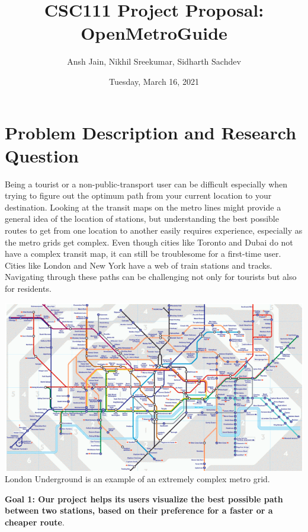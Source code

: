\documentclass[fontsize=11pt]{article}
\title{CSC111 Project Proposal: OpenMetroGuide}
\author{Ansh Jain, Nikhil Sreekumar, Sidharth Sachdev}
\date{Tuesday, March 16, 2021}
\begin{document}
    \maketitle

    \section*{Problem Description and Research Question}

    Being a tourist or a non-public-transport user can be difficult especially when trying to figure out the optimum path from your current location to your destination. Looking at the transit maps on the metro lines might provide a general idea of the location of stations, but understanding the best possible routes to get from one location to another easily requires experience, especially as the metro grids get complex. Even though cities like Toronto and Dubai do not have a complex transit map, it can still be troublesome for a first-time user. Cities like London and New York have a web of train stations and tracks. Navigating through these paths can be challenging not only for tourists but also for residents.\newline


    \begin{center}
        \includegraphics[width = 14cm]{London Transit Map.png}\newline
        London Underground is an example of an extremely complex metro grid.
    \end{center}

    \textbf{Goal 1: Our project helps its users visualize the best possible path between two stations, based on their preference for a faster or a cheaper route}.\newline
\end{document}

